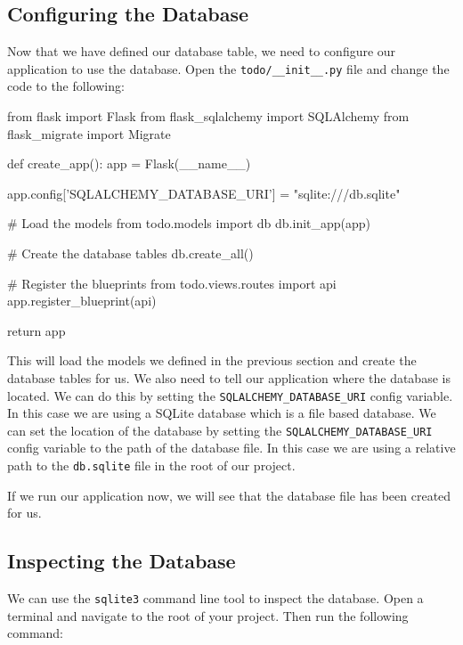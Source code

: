 \documentclass{csse4400}
\begin{document}
\subsection{Configuring the Database}

Now that we have defined our database table, we need to configure our application to use the database. Open the \texttt{todo/\_\_init\_\_.py} file and change the code to the following:

\begin{code}[language=python,numbers=none]{}
  from flask import Flask
  from flask_sqlalchemy import SQLAlchemy
  from flask_migrate import Migrate

  def create_app():
      app = Flask(__name__)

      app.config['SQLALCHEMY_DATABASE_URI'] = "sqlite:///db.sqlite"

      # Load the models
      from todo.models import db
      db.init_app(app)

      # Create the database tables
      db.create_all()

      # Register the blueprints
      from todo.views.routes import api
      app.register_blueprint(api)

      return app

\end{code}

This will load the models we defined in the previous section and create the database tables for us. We also need to tell our application where the database is located. We can do this by setting the \texttt{SQLALCHEMY\_DATABASE\_URI} config variable. In this case we are using a SQLite database which is a file based database. We can set the location of the database by setting the \texttt{SQLALCHEMY\_DATABASE\_URI} config variable to the path of the database file. In this case we are using a relative path to the \texttt{db.sqlite} file in the root of our project.

If we run our application now, we will see that the database file has been created for us.


\subsection{Inspecting the Database}

We can use the \texttt{sqlite3} command line tool to inspect the database. Open a terminal and navigate to the root of your project. Then run the following command:
\end{document}
